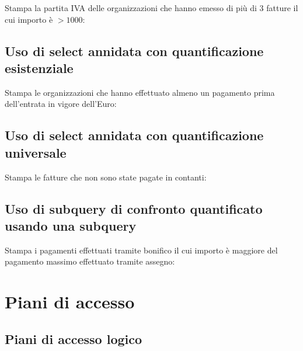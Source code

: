 \documentclass[a4paper,12pt]{article}
\begin{document}
Stampa la partita IVA delle organizzazioni che hanno emesso di più di 3 fatture il cui importo è $> 1000$:

\begin{minipage}{\textwidth}

\end{minipage}

 \subsection{ Uso di select annidata con quantificazione esistenziale }

Stampa le organizzazioni che hanno effettuato almeno un pagamento prima dell'entrata in vigore dell'Euro:

\begin{minipage}{\textwidth}

\end{minipage}

 \subsection{ Uso di select annidata con quantificazione universale }

Stampa le fatture che non sono state pagate in contanti:

\begin{minipage}{\textwidth}

\end{minipage}

 \subsection{ Uso di subquery di confronto quantificato usando una subquery }

Stampa i pagamenti effettuati tramite bonifico il cui importo è maggiore del pagamento massimo effettuato tramite assegno:

\begin{minipage}{\textwidth}

\end{minipage}

 \section{ Piani di accesso }

 \subsection{ Piani di accesso logico }
\end{document}
